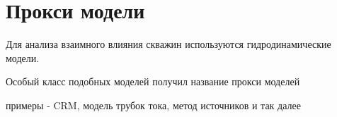 \section{Прокси модели}

Для анализа взаимного влияния скважин используются гидродинамические модели.

Особый класс подобных моделей получил название прокси моделей

примеры - CRM, модель трубок тока, метод источников и так далее
